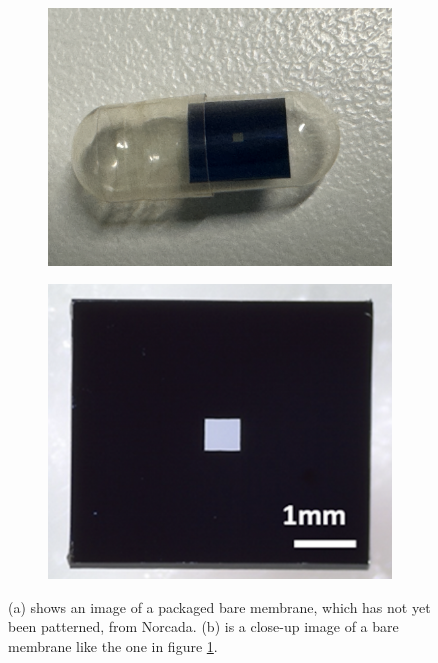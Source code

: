 \begin{figure}[h!]
    \centering
    \begin{subfigure}[b]{0.35\textwidth}
        \includegraphics[width=\textwidth]{figures/packaged_membrane_picture.png}
        \caption{}
        \label{fig:packaged_membrane}
    \end{subfigure}
    \hspace{1cm}
    \begin{subfigure}[b]{0.35\textwidth}
        \includegraphics[width=\textwidth]{figures/membrane_picture.png}
        \caption{}
        \label{fig:membrane_closeup}
    \end{subfigure}
    \caption{(a) shows an image of a packaged bare membrane, which has not yet been patterned, from Norcada. (b) is a close-up image of a bare membrane like the one in figure \ref{fig:packaged_membrane}.}
    \label{fig:membrane_pictures}
\end{figure}

